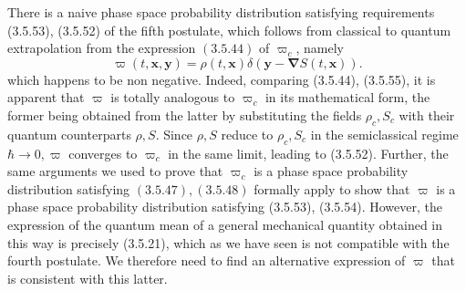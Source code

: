\documentclass{article}
\begin{document}
There is a naive phase space probability distribution satisfying requirements (3.5.53), (3.5.52) of the fifth postulate, which follows from classical to quantum
extrapolation from the expression $(3.5 .44)$ of $\varpi_{c}$, namely
$$
\begin{equation*}
\varpi(t, \boldsymbol{x}, \boldsymbol{y})=\rho(t, \boldsymbol{x}) \delta(\boldsymbol{y}-\boldsymbol{\nabla} S(t, \boldsymbol{x})) . \tag{3.5.55}
\end{equation*}
$$
which happens to be non negative. Indeed, comparing (3.5.44), (3.5.55), it is apparent that $\varpi$ is totally analogous to $\varpi_{c}$ in its mathematical form, the former being obtained from the latter by substituting the fields $\rho_{c}, S_{c}$ with their quantum counterparts $\rho, S$. Since $\rho, S$ reduce to $\rho_{c}, S_{c}$ in the semiclassical regime $\hbar \rightarrow 0, \varpi$ converges to $\varpi_{c}$ in the same limit, leading to (3.5.52). Further, the same arguments we used to prove that $\varpi_{c}$ is a phase space probability distribution satisfying $(3.5 .47),(3.5 .48)$ formally apply to show that $\varpi$ is a phase space probability distribution satisfying (3.5.53), (3.5.54). However, the expression of the quantum mean of a general mechanical quantity obtained in this way is precisely (3.5.21), which as we have seen is not compatible with the fourth postulate. We therefore need to find an alternative expression of $\varpi$ that is consistent with this latter.
\end{document}
